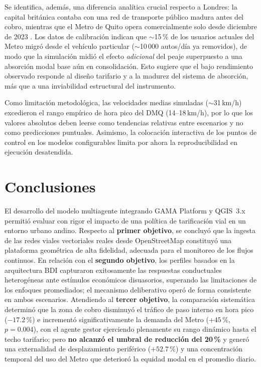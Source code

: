 \documentclass[twocolumn,10pt]{article}
\begin{document}
Se identifica, adem\'as, una diferencia anal\'itica crucial respecto a Londres: la capital
brit\'anica contaba con una red de transporte p\'ublico madura antes del cobro, mientras
que el Metro de Quito opera comercialmente solo desde diciembre de 2023 \cite{metro2025}.
Los datos de calibraci\'on indican que $\sim$15\,\% de los usuarios actuales del Metro
migr\'o desde el veh\'iculo particular ($\sim$10\,000 autos/d\'ia ya removidos), de modo
que la simulaci\'on midi\'o el efecto \textit{adicional} del peaje superpuesto a una
absorci\'on modal base a\'un en consolidaci\'on. Esto sugiere que el bajo rendimiento
observado responde al dise\~no tarifario y a la madurez del sistema de absorci\'on, m\'as
que a una inviabilidad estructural del instrumento.

Como limitaci\'on metodol\'ogica, las velocidades medias simuladas ($\sim$31\,km/h)
excedieron el rango emp\'irico de hora pico del DMQ (14--18\,km/h), por lo que los valores
absolutos deben leerse como tendencias relativas entre escenarios y no como predicciones
puntuales. Asimismo, la colocaci\'on interactiva de los puntos de control en los modelos
configurables limita por ahora la reproducibilidad en ejecuci\'on desatendida.

\FloatBarrier
\section{Conclusiones}
El desarrollo del modelo multiagente integrando GAMA Platform y QGIS~3.x permiti\'o
evaluar con rigor el impacto de una pol\'itica de tarificaci\'on vial en un entorno urbano
andino. Respecto al \textbf{primer objetivo}, se concluy\'o que la ingesta de las redes
viales vectoriales reales desde OpenStreetMap constituy\'o una plataforma geom\'etrica de
alta fidelidad, adecuada para el monitoreo de los flujos continuos. En relaci\'on con el
\textbf{segundo objetivo}, los perfiles basados en la arquitectura BDI capturaron
exitosamente las respuestas conductuales heterog\'eneas ante est\'imulos econ\'omicos
disuasorios, superando las limitaciones de los enfoques promediados; el mecanismo
deliberativo oper\'o de forma consistente en ambos escenarios. Atendiendo al \textbf{tercer
objetivo}, la comparaci\'on sistem\'atica determin\'o que la zona de cobro disminuy\'o el
tr\'afico de paso interno en hora pico ($-17.2$\,\%) e increment\'o significativamente la
demanda del Metro ($+45$\,\%, $p=0.004$), con el agente gestor ejerciendo plenamente su
rango din\'amico hasta el techo tarifario; pero \textbf{no alcanz\'o el umbral de
reducci\'on del 20\,\%} y gener\'o una externalidad de desplazamiento perif\'erico
($+52.7$\,\%) y una concentraci\'on temporal del uso del Metro que deterior\'o la equidad
modal en el promedio diario.
\end{document}
